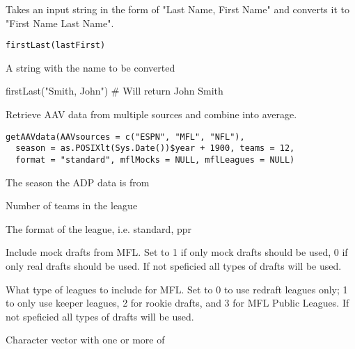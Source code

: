 \documentclass[a4paper]{book}
\begin{document}
%
\begin{Description}\relax
Takes an input string in the form of "Last Name, First Name" and converts it
to "First Name Last Name".
\end{Description}
%
\begin{Usage}
\begin{verbatim}
firstLast(lastFirst)
\end{verbatim}
\end{Usage}
%
\begin{Arguments}
\begin{ldescription}
\item[\code{lastFist}] A string with the name to be converted
\end{ldescription}
\end{Arguments}
%
\begin{Examples}
\begin{ExampleCode}
firstLast("Smith, John") # Will return John Smith
\end{ExampleCode}
\end{Examples}
%
\begin{Description}\relax
Retrieve AAV data from multiple sources and combine into average.
\end{Description}
%
\begin{Usage}
\begin{verbatim}
getAAVdata(AAVsources = c("ESPN", "MFL", "NFL"),
  season = as.POSIXlt(Sys.Date())$year + 1900, teams = 12,
  format = "standard", mflMocks = NULL, mflLeagues = NULL)
\end{verbatim}
\end{Usage}
%
\begin{Arguments}
\begin{ldescription}
\item[\code{season}] The season the ADP data is from

\item[\code{teams}] Number of teams in the league

\item[\code{format}] The format of the league, i.e. standard, ppr

\item[\code{mflMocks}] Include mock drafts from MFL. Set to 1 if only mock drafts
should be used, 0 if only real drafts should be used. If not speficied all
types of drafts will be used.

\item[\code{mflLeagues}] What type of leagues to include for MFL. Set to 0 to use
redraft leagues only; 1 to only use keeper leagues, 2 for rookie drafts, and
3 for MFL Public Leagues. If not speficied all types of drafts will be used.

\item[\code{ADPsource}] Character vector with one or more of
\end{ldescription}
\end{Arguments}
\end{document}
